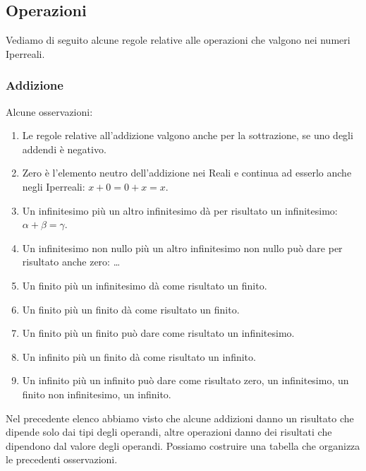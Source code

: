 \vspace{-5mm}

\subsection{Operazioni}
\label{subsec:insnum_operazioni}

Vediamo di seguito alcune regole relative alle operazioni 
che valgono nei numeri Iperreali.

\subsubsection{Addizione}
\label{subsec:insnum_addizione}

\begin{multicols}{2}
Alcune osservazioni:

\begin{enumerate} [noitemsep]
 \item Le regole relative all'addizione valgono anche per la sottrazione, 
se 
uno degli addendi è negativo. 
 \item Zero è l'elemento neutro dell'addizione nei Reali e continua ad 
esserlo 
anche negli Iperreali: $x+0=0+x=x$.
 \item Un infinitesimo più un altro infinitesimo dà per risultato un 
infinitesimo: $\alpha+\beta=\gamma$.
 \item Un infinitesimo non nullo più un altro infinitesimo non nullo può 
dare 
per risultato anche zero: \dots
 \item Un finito più un infinitesimo dà come risultato un finito.
 \item Un finito più un finito dà come risultato un finito.
 \item Un finito più un finito può dare come risultato un infinitesimo.
 \item Un infinito più un finito dà come risultato un infinito.
 \item Un infinito più un infinito può dare come risultato zero, un 
infinitesimo, un finito non infinitesimo, un infinito.
\end{enumerate}

Nel precedente elenco abbiamo visto che alcune addizioni danno un risultato 
che dipende solo dai tipi degli operandi, altre operazioni danno dei 
risultati 
che dipendono dal valore degli operandi. Possiamo costruire una tabella che 
organizza le precedenti osservazioni.


\end{multicols}
